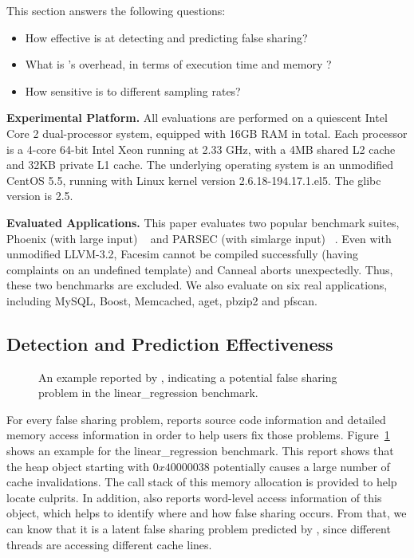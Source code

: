 


\label{sec:evaluation}

This section answers the following questions:
\begin{itemize}
\item
  How effective is \Predator{} at detecting and predicting false sharing?

\item
  What is \Predator{}'s overhead, in terms of execution time and memory ?

\item
  How sensitive is \Predator{} to different sampling rates?
 
\end{itemize}

\textbf{Experimental Platform.} All evaluations are performed on a quiescent Intel Core 2 dual-processor system,  equipped with 16GB RAM in total. Each processor is a 4-core 64-bit Intel Xeon running at 2.33 GHz, with a 4MB shared L2 cache and 32KB private L1 cache. The underlying operating system is an unmodified CentOS 5.5, running with Linux kernel version 2.6.18-194.17.1.el5. The glibc version is 2.5. 

\textbf{Evaluated Applications.}
This paper evaluates two popular benchmark suites,
Phoenix (with large input) ~\cite{phoenix-hpca} and PARSEC (with simlarge input) ~\cite{parsec}. Even with unmodified LLVM-3.2, Facesim cannot be compiled successfully (having complaints on an undefined template) and Canneal aborts unexpectedly. Thus, these two benchmarks are excluded.
We also evaluate \Predator{} on six real applications, including MySQL, Boost, Memcached, aget, pbzip2 and pfscan.



\subsection{Detection and Prediction Effectiveness}
\label{sec:predatoreffective}

\begin{figure}[htb]
{\centering
\tiny
\subfigure{}
\caption{An example reported by \Predator{}, indicating a potential false sharing problem in the linear\_regression benchmark.
\label{fig:lrreport}}
}
\end{figure}

For every false sharing problem, \Predator{} reports source code information and detailed memory access information in order to help users fix those problems. Figure~\ref{fig:lrreport} shows an example for the linear\_regression benchmark. This report shows that the heap object starting with $0x40000038$ potentially causes a large number of cache invalidations. The call stack of this memory allocation is provided to help locate culprits. In addition, \Predator{} also reports word-level access information of this object, which helps to identify where and how false sharing occurs. From that, we can know that it is a latent false sharing problem predicted by \Predator{}, since different threads are accessing different cache lines. 

